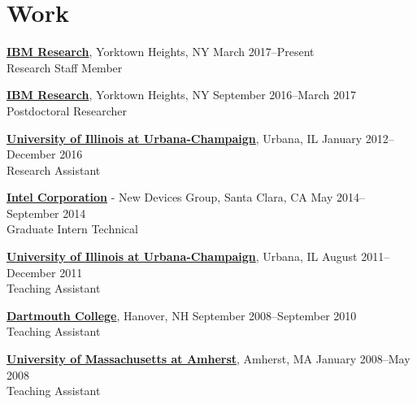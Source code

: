
\section{\sc Work}
{\href{http://www.research.ibm.com/}{{\bf IBM Research}}}, Yorktown Heights, NY \hfill March 2017--Present\\
Research Staff Member
\vspace{-0.16cm}

{\href{http://www.research.ibm.com/}{{\bf IBM Research}}}, Yorktown Heights, NY \hfill September 2016--March 2017\\
Postdoctoral Researcher
\vspace{-0.16cm}

{\href{http://www.illinois.edu/}{{\bf University of Illinois at Urbana-Champaign}}}, Urbana, IL \hfill January 2012--December 2016\\
Research Assistant
\vspace{-0.16cm}

{\href{http://www.intel.com/}{{\bf Intel Corporation}}} - New Devices Group, Santa Clara, CA \hfill May 2014--September 2014\\
Graduate Intern Technical
\vspace{-0.16cm}

{\href{http://www.illinois.edu/}{{\bf University of Illinois at Urbana-Champaign}}}, Urbana, IL \hfill August 2011--December 2011\\
Teaching Assistant
\vspace{-0.16cm}

{\href{http://www.dartmouth.edu/}{{\bf Dartmouth College}}}, Hanover, NH \hfill September 2008--September 2010\\
Teaching Assistant
\vspace{-0.16cm}

{\href{http://www.umass.edu/}{{\bf University of Massachusetts at Amherst}}}, Amherst, MA \hfill January 2008--May 2008\\
Teaching Assistant
